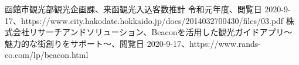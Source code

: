 
\begin{thebibliography}{9}
  函館市観光部観光企画課、来函観光入込客数推計 令和元年度、閲覧日 2020-9-17、https://www.city.hakodate.hokkaido.jp/docs/2014032700430/files/03.pdf
  株式会社リサーチアンドソリューション、Beaconを活用した観光ガイドアプリ～魅力的な街創りをサポート～、閲覧日 2020-9-17、https://www.rands-co.com/lp/beacon.html
\end{thebibliography}
